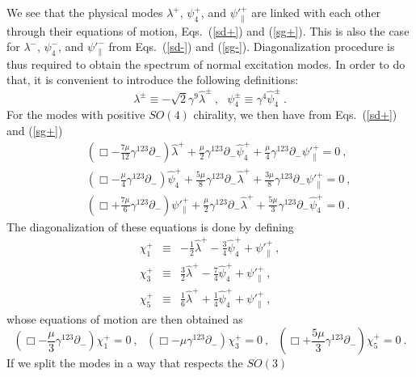 \documentclass[a4paper,12pt]{article}
\numberwithin{equation}{section}
\begin{document}
We see that the physical modes $\lambda^+$, $\psi^+_4$, and
$\psi'^+_\|$ are linked with each other through their equations of
motion, Eqs.~(\ref{sd+}) and (\ref{sg+}).  This is also the case for
$\lambda^-$, $\psi^-_4$, and $\psi'^-_\|$ from Eqs.~(\ref{sd-}) and
(\ref{sg-}).  Diagonalization procedure is thus required to obtain the
spectrum of normal excitation modes.  In order to do that, it is
convenient to introduce the following definitions:
\begin{equation}
\lambda^\pm \equiv - \sqrt{2} \gamma^9 \hat{\lambda}^\pm~,~~~
\psi^\pm_4 \equiv \gamma^4 \hat{\psi}^\pm_4 ~.
\label{redef}
\end{equation}
For the modes with positive $SO(4)$ chirality, we then have from
Eqs.~(\ref{sd+}) and (\ref{sg+})
\begin{eqnarray}
& & ( \Box - \frac{7\mu}{12} \gamma^{123} \partial_- )
   \hat{\lambda}^+
   + \frac{\mu}{2} \gamma^{123} \partial_- \hat{\psi}^+_4
   + \frac{\mu}{4} \gamma^{123} \partial_- \psi'^+_\| = 0 ~,
            \nonumber \\
& & ( \Box - \frac{\mu}{4} \gamma^{123} \partial_- )
   \hat{\psi}^+_4
   + \frac{5\mu}{8} \gamma^{123} \partial_- \hat{\lambda}^+
   + \frac{3\mu}{8} \gamma^{123} \partial_- \psi'^+_\| = 0 ~,
            \nonumber \\
& & ( \Box + \frac{7\mu}{6} \gamma^{123} \partial_- )
   \psi'^+_\|
   + \frac{\mu}{2} \gamma^{123} \partial_- \hat{\lambda}^+
   + \frac{5\mu}{3} \gamma^{123} \partial_- \hat{\psi}^+_4 = 0 ~.
\end{eqnarray}
The diagonalization of these equations is done by defining
\begin{eqnarray}
\chi^+_1 & \equiv &
     - \frac{1}{2} \hat{\lambda}^+
     - \frac{3}{4} \hat{\psi}^+_4 + \psi'^+_\| ~,
          \nonumber \\
\chi^+_3 & \equiv &
     \frac{3}{2} \hat{\lambda}^+
     - \frac{7}{4} \hat{\psi}^+_4 + \psi'^+_\| ~,
          \nonumber \\
\chi^+_5 & \equiv &
      \frac{1}{6} \hat{\lambda}^+
     + \frac{1}{4} \hat{\psi}^+_4 + \psi'^+_\| ~,
\end{eqnarray}
whose equations of motion are then obtained as
\begin{equation}
( \Box - \frac{\mu}{3} \gamma^{123} \partial_- )
     \chi^+_1 = 0 ~,~~~
( \Box - \mu \gamma^{123} \partial_- )
     \chi^+_3 = 0 ~,~~~
( \Box + \frac{5 \mu}{3} \gamma^{123} \partial_- )
     \chi^+_5 = 0 ~.
\end{equation}
If we split the modes in a way that respects the $SO(3)$
\end{document}
